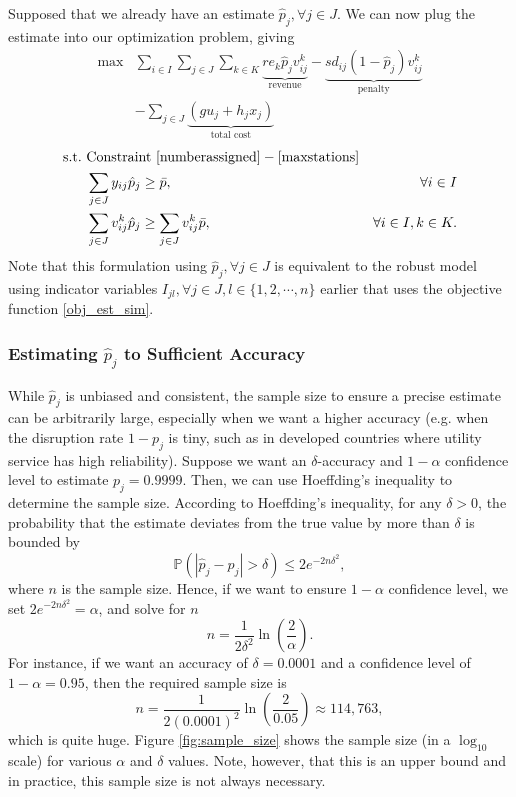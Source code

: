 \documentclass[preprint]{oscmjournal}
\theoremstyle{remark}
\begin{document}
Supposed that we already have an estimate $\hat p_j, \forall j 
\in J$. We can now plug the estimate into our optimization problem, giving
\begin{align}
\max &\sum_{i \in I} \sum_{j \in J} \sum_{k \in K}
\underbrace{r e_k \hat p_j  v_{ij}^k}_{\text{revenue}} - \underbrace{s d_{ij} (1-\hat p_j)  v_{ij}^k}_{\text{penalty}}  \nonumber \\
&-  \sum_{j \in J} \underbrace{(g u_j + h_j x_j)}_{\text{total cost}} 
\label{obj_est_phat}
\end{align}
\begin{align}
    \text{s.t.}~&\text{Constraint } \eqref{numberassigned}-\eqref{maxstations} \nonumber \\
    &\sum_{j \in J} y_{ij} \hat p_j \geq \bar{p}, & \forall i \in I \label{reliability_est_phat} \\
    &\sum_{j \in J} v_{ij}^k \hat p_j \geq \sum_{j \in J} v_{ij}^k\bar{p}, & \forall i \in I, k \in K \label{reliability_v_est_hat}.
\end{align}
Note that this formulation using $\hat p_j, \forall j \in J$ is equivalent to the robust model using indicator variables $I_{jl}, \forall j \in J, l \in \{1, 2, \cdots, n\}$ earlier that uses the objective function \eqref{obj_est_sim}.


\subsubsection{Estimating $\hat p_j$ to Sufficient Accuracy}

While $\hat p_j$ is unbiased and consistent, the sample size to ensure a precise estimate can be arbitrarily large, especially when we want a higher accuracy (e.g. when the disruption rate $1-p_j$ is tiny, such as in developed countries where utility service has high reliability). Suppose we want an $\delta$-accuracy and $1-\alpha$ confidence level to estimate $p_j = 0.9999$. Then, we can use Hoeffding's inequality to determine the sample size. According to Hoeffding's inequality, for any $\delta > 0$, the probability that the estimate deviates from the true value by more than $\delta$ is bounded by
\begin{equation}
\mathbb P(|\hat p_j - p_j| > \delta) \leq 2e^{-2n\delta^2},
\end{equation}
where $n$ is the sample size. Hence, if we want to ensure $1-\alpha$ confidence level, we set $2e^{-2n\delta^2} = \alpha$, and solve for $n$
\begin{equation}
n = \frac{1}{2\delta^2}\ln\left(\frac{2}{\alpha}\right).
\end{equation}
For instance, if we want an accuracy of $\delta = 0.0001$ and a confidence level of $1-\alpha = 0.95$, then the required sample size is
\begin{equation}
n = \frac{1}{2(0.0001)^2}\ln \left(\frac{2}{0.05}\right) \approx 114,763,
\end{equation}
which is quite huge. Figure \ref{fig:sample_size} shows the sample size (in a $\log_{10}$ scale) for various $\alpha$ and $\delta$ values. Note, however, that this is an upper bound and in practice, this sample size is not always necessary.
\end{document}
